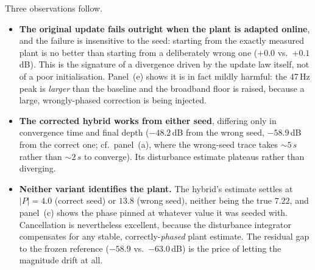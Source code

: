 \documentclass[11pt]{article}
\newcommand{\SI}[2]{#1\,#2}
\begin{document}
Three observations follow.
\begin{itemize}\itemsep2pt
  \item \textbf{The original update fails outright when the plant is
    adapted online}, and the failure is insensitive to the seed: starting
    from the exactly measured plant is no better than starting from a
    deliberately wrong one ($+0.0$ vs.\ $+0.1$\,dB). This is the signature
    of a divergence driven by the update law itself, not of a poor
    initialisation. Panel~(e) shows it is in fact mildly harmful: the
    \SI{47}{Hz} peak is \emph{larger} than the baseline and the broadband
    floor is raised, because a large, wrongly-phased correction is being
    injected.
  \item \textbf{The corrected hybrid works from either seed}, differing
    only in convergence time and final depth ($-48.2$\,dB from the wrong
    seed, $-58.9$\,dB from the correct one; cf.\ panel~(a), where the
    wrong-seed trace takes ${\sim}\SI{5}{s}$ rather than ${\sim}\SI{2}{s}$
    to converge). Its disturbance estimate plateaus rather than diverging.
  \item \textbf{Neither variant identifies the plant.} The hybrid's
    estimate settles at $|P|=4.0$ (correct seed) or $13.8$ (wrong seed),
    neither being the true $7.22$, and panel~(c) shows the phase pinned at
    whatever value it was seeded with. Cancellation is nevertheless
    excellent, because the disturbance integrator compensates for any
    stable, correctly-\emph{phased} plant estimate. The residual gap to the
    frozen reference ($-58.9$ vs.\ $-63.0$\,dB) is the price of letting the
    magnitude drift at all.
\end{itemize}
\end{document}
